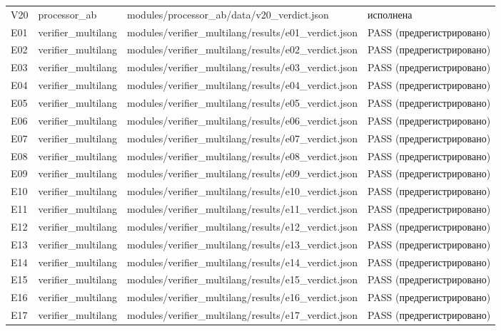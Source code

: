 \documentclass[11pt,a4paper]{article}
\begin{document}
\begin{table}[htbp]
\begin{tabular}{p{} p{} p{} p{}}
V20 & processor\_ab & modules/processor\_ab/data/v20\_verdict.json & исполнена \\
E01 & verifier\_multilang & modules/verifier\_multilang/results/e01\_verdict.json & PASS (предрегистрировано) \\
E02 & verifier\_multilang & modules/verifier\_multilang/results/e02\_verdict.json & PASS (предрегистрировано) \\
E03 & verifier\_multilang & modules/verifier\_multilang/results/e03\_verdict.json & PASS (предрегистрировано) \\
E04 & verifier\_multilang & modules/verifier\_multilang/results/e04\_verdict.json & PASS (предрегистрировано) \\
E05 & verifier\_multilang & modules/verifier\_multilang/results/e05\_verdict.json & PASS (предрегистрировано) \\
E06 & verifier\_multilang & modules/verifier\_multilang/results/e06\_verdict.json & PASS (предрегистрировано) \\
E07 & verifier\_multilang & modules/verifier\_multilang/results/e07\_verdict.json & PASS (предрегистрировано) \\
E08 & verifier\_multilang & modules/verifier\_multilang/results/e08\_verdict.json & PASS (предрегистрировано) \\
E09 & verifier\_multilang & modules/verifier\_multilang/results/e09\_verdict.json & PASS (предрегистрировано) \\
E10 & verifier\_multilang & modules/verifier\_multilang/results/e10\_verdict.json & PASS (предрегистрировано) \\
E11 & verifier\_multilang & modules/verifier\_multilang/results/e11\_verdict.json & PASS (предрегистрировано) \\
E12 & verifier\_multilang & modules/verifier\_multilang/results/e12\_verdict.json & PASS (предрегистрировано) \\
E13 & verifier\_multilang & modules/verifier\_multilang/results/e13\_verdict.json & PASS (предрегистрировано) \\
E14 & verifier\_multilang & modules/verifier\_multilang/results/e14\_verdict.json & PASS (предрегистрировано) \\
E15 & verifier\_multilang & modules/verifier\_multilang/results/e15\_verdict.json & PASS (предрегистрировано) \\
E16 & verifier\_multilang & modules/verifier\_multilang/results/e16\_verdict.json & PASS (предрегистрировано) \\
E17 & verifier\_multilang & modules/verifier\_multilang/results/e17\_verdict.json & PASS (предрегистрировано) \\

\end{tabular}
\end{table}
\end{document}
